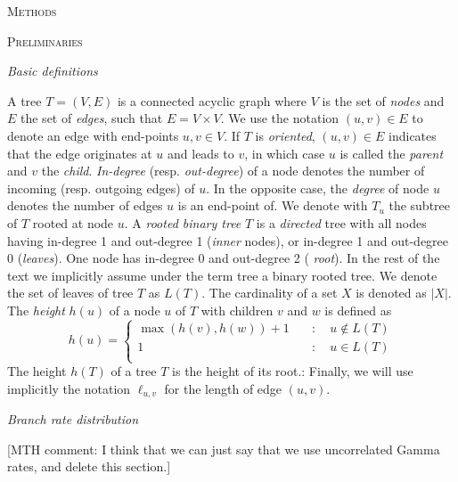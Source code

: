 \documentclass{llncs}
\newcommand{\mthcomment}[1]{{[\color{red}MTH comment: #1]}}
\renewcommand{\section}[1]{%
\bigskip
\begin{center}
\begin{Large}
\normalfont\scshape #1
\medskip
\end{Large}
\end{center}}
\renewcommand{\subsection}[1]{%
\bigskip
\begin{center}
\begin{large}
\normalfont\itshape #1
\end{large}
\end{center}}
\begin{document}
\section{Methods}

\section {Preliminaries}
%
%
\subsection{Basic definitions}

%
A tree $T=(V,E)$ is a connected acyclic graph where $V$ is the set of {\em
nodes} and $E$ the set of {\em edges}, such that $E = V\times V$. We use the
notation $(u,v) \in E$ to denote an edge with end-points $u,v \in V$. If $T$ is
{\em oriented}, $(u,v) \in E$ indicates that the edge originates at $u$ and leads
to $v$, in which case $u$ is called the {\em parent} and $v$ the {\em child}.
{\em In-degree} (resp. {\em out-degree}) of a node denotes the
number of incoming (resp. outgoing edges) of $u$. In the opposite case, the
{\em degree} of node $u$ denotes the number of edges $u$ is an end-point of.
We denote with $T_u$ the subtree of $T$ rooted at node $u$.  A {\em
rooted binary tree} $T$ is a {\em directed} tree with all nodes having
in-degree 1 and out-degree 1 ({\em inner} nodes), or in-degree 1 and out-degree
0 ({\em leaves}). One node has in-degree 0 and out-degree 2 ({\em
root}).  In the rest of the text we implicitly assume under the term tree a
binary rooted tree.  We denote the set of leaves of tree $T$ as $L(T)$.  The
cardinality of a set $X$ is denoted as $|X|$. The {\em height} $h(u)$ of a node
$u$ of $T$ with children $v$ and $w$ is defined as 
%
\[ h(u) = \left\{ \begin{array}{ll}
\max(h(v), h(w)) + 1 & \quad : \quad u \notin L(T)\\
1                    & \quad : \quad u    \in L(T)\\
\end{array}\right. \] 
The height $h(T)$ of a tree $T$ is the height of its root.: Finally, we will
use implicitly the notation $\ell_{u,v}$ for the length of edge $(u,v)$.

\subsection{Branch rate distribution}
\mthcomment{I think that we can just say that we use uncorrelated Gamma rates, and delete this section.}
\end{document}
